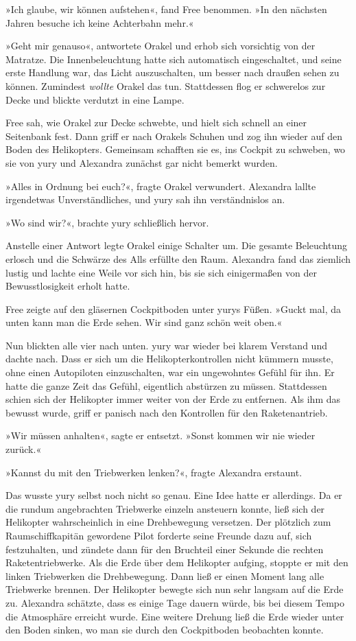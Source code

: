 »Ich glaube, wir können aufstehen«, fand Free benommen. »In den nächsten Jahren besuche ich keine Achterbahn mehr.«

»Geht mir genauso«, antwortete Orakel und erhob sich vorsichtig von der Matratze. Die Innenbeleuchtung hatte sich automatisch eingeschaltet, und seine erste Handlung war, das Licht auszuschalten, um besser nach draußen sehen zu können. Zumindest \emph{wollte} Orakel das tun. Stattdessen flog er schwerelos zur Decke und blickte verdutzt in eine Lampe.

Free sah, wie Orakel zur Decke schwebte, und hielt sich schnell an einer Seitenbank fest. Dann griff er nach Orakels Schuhen und zog ihn wieder auf den Boden des Helikopters. Gemeinsam schafften sie es, ins Cockpit zu schweben, wo sie von yury und Alexandra zunächst gar nicht bemerkt wurden.

»Alles in Ordnung bei euch?«, fragte Orakel verwundert. Alexandra lallte irgendetwas Unverständliches, und yury sah ihn verständnislos an.

»Wo sind wir?«, brachte yury schließlich hervor.

Anstelle einer Antwort legte Orakel einige Schalter um. Die gesamte Beleuchtung erlosch und die Schwärze des Alls erfüllte den Raum. Alexandra fand das ziemlich lustig und lachte eine Weile vor sich hin, bis sie sich einigermaßen von der Bewusstlosigkeit erholt hatte.

Free zeigte auf den gläsernen Cockpitboden unter yurys Füßen. »Guckt mal, da unten kann man die Erde sehen. Wir sind ganz schön weit oben.«

Nun blickten alle vier nach unten. yury war wieder bei klarem Verstand und dachte nach. Dass er sich um die Helikopterkontrollen nicht kümmern musste, ohne einen Autopiloten einzuschalten, war ein ungewohntes Gefühl für ihn. Er hatte die ganze Zeit das Gefühl, eigentlich abstürzen zu müssen. Stattdessen schien sich der Helikopter immer weiter von der Erde zu entfernen. Als ihm das bewusst wurde, griff er panisch nach den Kontrollen für den Raketenantrieb.

»Wir müssen anhalten«, sagte er entsetzt. »Sonst kommen wir nie wieder zurück.«

»Kannst du mit den Triebwerken lenken?«, fragte Alexandra erstaunt.

Das wusste yury selbst noch nicht so genau. Eine Idee hatte er allerdings. Da er die rundum angebrachten Triebwerke einzeln ansteuern konnte, ließ sich der Helikopter wahrscheinlich in eine Drehbewegung versetzen. Der plötzlich zum Raumschiffkapitän gewordene Pilot forderte seine Freunde dazu auf, sich festzuhalten, und zündete dann für den Bruchteil einer Sekunde die rechten Raketentriebwerke. Als die Erde über dem Helikopter aufging, stoppte er mit den linken Triebwerken die Drehbewegung. Dann ließ er einen Moment lang alle Triebwerke brennen. Der Helikopter bewegte sich nun sehr langsam auf die Erde zu. Alexandra schätzte, dass es einige Tage dauern würde, bis bei diesem Tempo die Atmosphäre erreicht wurde. Eine weitere Drehung ließ die Erde wieder unter den Boden sinken, wo man sie durch den Cockpitboden beobachten konnte.

